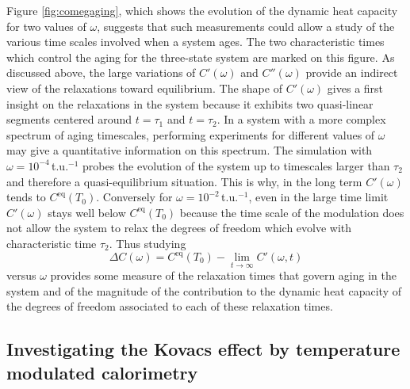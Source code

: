 \documentclass[pre,a4paper,twocolumn,superscriptaddress,%
floatfix]{revtex4}
\begin{document}
\medskip
Figure \ref{fig:comegaging}, which shows the evolution of the dynamic heat
capacity for two values of $\omega$, suggests that such measurements could
allow a study of the various time scales involved when a system ages.
The two characteristic times which control the aging for the
three-state system are marked on this figure.
As discussed above, the large variations of $C'(\omega)$
and $C''(\omega)$ provide an indirect view of the relaxations toward
equilibrium. The shape of $C'(\omega)$ gives a first insight on the
relaxations in the system because it exhibits two quasi-linear segments
centered around $t = \tau_1$ and $t=\tau_2$. In a system
with a more complex spectrum of aging timescales,
performing experiments for different values of $\omega$ may give a
quantitative information on this spectrum. The simulation
with $\omega = 10^{-4}\,$t.u.$^{-1}$
probes the evolution of the system up to timescales
larger than $\tau_2$ and therefore a quasi-equilibrium situation. This is why,
in the long term $C'(\omega)$ tends to $C^{\mathrm{eq}}(T_0)$. Conversely
for $\omega = 10^{-2}\,$t.u.$^{-1}$,
even in the large time limit $C'(\omega)$ stays well
below $C^{\mathrm{eq}}(T_0)$ because the time scale of the modulation does not
allow the system to relax the degrees of freedom which evolve with
characteristic time $\tau_2$. Thus studying
\begin{equation}
  \label{eq:diffcomeg}
  \Delta C(\omega) = C^{\mathrm{eq}}(T_0) - \lim_{t \to \infty} C'(\omega,t)
\end{equation}
versus $\omega$ provides some measure of the relaxation times that govern
aging in the system and of the magnitude of the contribution to the dynamic
heat capacity of the degrees of freedom associated to each of these relaxation
times. 

\subsection{Investigating the Kovacs effect by temperature modulated calorimetry}
\label{sec:kovacs}
\end{document}

